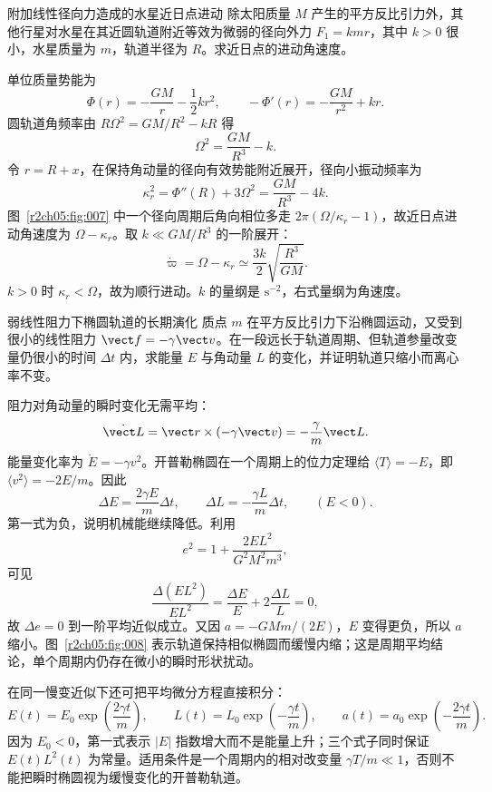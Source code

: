 \begin{practicebox}{附加线性径向力造成的水星近日点进动}
除太阳质量 $M$ 产生的平方反比引力外，其他行星对水星在其近圆轨道附近等效为微弱的径向外力 $F_1=kmr$，其中 $k>0$ 很小，水星质量为 $m$，轨道半径为 $R$。求近日点的进动角速度。
\label{r2ch05:pr:005}
\begin{solution}
单位质量势能为
\[
 \Phi(r)=-\frac{GM}{r}-\frac12kr^2,\qquad
 -\Phi'(r)=-\frac{GM}{r^2}+kr.
\]
圆轨道角频率由 $R\Omega^2=GM/R^2-kR$ 得
\[
 \Omega^2=\frac{GM}{R^3}-k.
\]
令 $r=R+x$，在保持角动量的径向有效势能附近展开，径向小振动频率为
\[
 \kappa_r^2=\Phi''(R)+3\Omega^2
 =\frac{GM}{R^3}-4k.
\]
图~\ref{r2ch05:fig:007} 中一个径向周期后角向相位多走 $2\pi(\Omega/\kappa_r-1)$，故近日点进动角速度为 $\Omega-\kappa_r$。取 $k\ll GM/R^3$ 的一阶展开：
\begin{equation}
 \boxed{\dot\varpi=\Omega-\kappa_r
 \simeq\frac{3k}{2}\sqrt{\frac{R^3}{GM}}}.
 \label{r2ch05:eq:022}
\end{equation}
$k>0$ 时 $\kappa_r<\Omega$，故为顺行进动。$k$ 的量纲是 $\mathrm{s}^{-2}$，右式量纲为角速度。
\figApsidalAdvance
\end{solution}
\end{practicebox}

\begin{practicebox}{弱线性阻力下椭圆轨道的长期演化}
质点 $m$ 在平方反比引力下沿椭圆运动，又受到很小的线性阻力 $\vect f=-\gamma\vect v$。在一段远长于轨道周期、但轨道参量改变量仍很小的时间 $\Delta t$ 内，求能量 $E$ 与角动量 $L$ 的变化，并证明轨道只缩小而离心率不变。
\label{r2ch05:pr:006}
\begin{solution}
阻力对角动量的瞬时变化无需平均：
\[
 \dot{\vect L}=\vect r\times(-\gamma\vect v)
 =-\frac\gamma m\vect L.
\]
能量变化率为 $\dot E=-\gamma v^2$。开普勒椭圆在一个周期上的位力定理给 $\langle T\rangle=-E$，即 $\langle v^2\rangle=-2E/m$。因此
\begin{equation}
 \boxed{\Delta E=\frac{2\gamma E}{m}\Delta t},\qquad
 \boxed{\Delta L=-\frac{\gamma L}{m}\Delta t},\qquad(E<0).
 \label{r2ch05:eq:023}
\end{equation}
第一式为负，说明机械能继续降低。利用
\[
 e^2=1+\frac{2EL^2}{G^2M^2m^3},
\]
可见
\[
 \frac{\Delta(EL^2)}{EL^2}
 =\frac{\Delta E}{E}+2\frac{\Delta L}{L}=0,
\]
故 $\boxed{\Delta e=0}$ 到一阶平均近似成立。又因 $a=-GMm/(2E)$，$E$ 变得更负，所以 $a$ 缩小。图~\ref{r2ch05:fig:008} 表示轨道保持相似椭圆而缓慢内缩；这是周期平均结论，单个周期内仍存在微小的瞬时形状扰动。

在同一慢变近似下还可把平均微分方程直接积分：
\[
 E(t)=E_0\exp\!\left(\frac{2\gamma t}{m}\right),\qquad
 L(t)=L_0\exp\!\left(-\frac{\gamma t}{m}\right),\qquad
 a(t)=a_0\exp\!\left(-\frac{2\gamma t}{m}\right).
\]
因为 $E_0<0$，第一式表示 $|E|$ 指数增大而不是能量上升；三个式子同时保证 $E(t)L^2(t)$ 为常量。适用条件是一个周期内的相对改变量 $\gamma T/m\ll1$，否则不能把瞬时椭圆视为缓慢变化的开普勒轨道。
\figDampedOrbit
\end{solution}
\end{practicebox}
